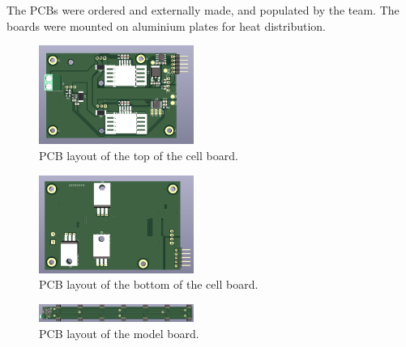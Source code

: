 The PCBs were ordered and externally made, and populated by the 
team. The boards were mounted on aluminium plates for heat 
distribution. 
\FloatBarrier
\begin{figure}[h]
    \centering
    \includegraphics[width=0.45\textwidth]{pcb_cell_board_top.png}
    \caption{PCB layout of the top of the cell board.}
    \label{fig:pcb_top_cellboard}
\end{figure}
\FloatBarrier
\begin{figure}[h]
    \centering
    \includegraphics[width=0.45\textwidth]{pcb_cell_board_bottom.png}
    \caption{PCB layout of the bottom of the cell board.}
    \label{fig:pcb_bottom_cellboard}
\end{figure}
\FloatBarrier
\begin{figure}[h]
    \centering
    \includegraphics[width=0.45\textwidth]{pcb_model_board_top.png}
    \caption{PCB layout of the model board.}
    \label{fig:pcb_modelboard}
\end{figure}
\FloatBarrier